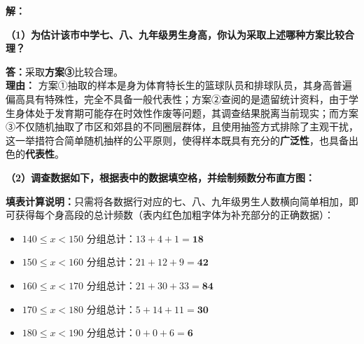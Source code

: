 \vspace{0.4cm}

\textbf{解：}

\textbf{（1）为估计该市中学七、八、九年级男生身高，你认为采取上述哪种方案比较合理？}

\vspace{0.2cm}
\textbf{答：}采取\textbf{方案③}比较合理。\\
\textbf{理由：} 方案①抽取的样本是身为体育特长生的篮球队员和排球队员，其身高普遍偏高具有特殊性，完全不具备一般代表性；方案②查阅的是遗留统计资料，由于学生身体处于发育期可能存在时效性作废等问题，其调查结果脱离当前现实；而方案③不仅随机抽取了市区和郊县的不同圈层群体，且使用抽签方式排除了主观干扰，这一举措符合简单随机抽样的公平原则，使得样本既具有充分的\textbf{广泛性}，也具备出色的\textbf{代表性}。

\vspace{0.6cm}

\textbf{（2）调查数据如下，根据表中的数据填空格，并绘制频数分布直方图：}

\vspace{0.2cm}
\textbf{填表计算说明：}只需将各数据行对应的七、八、九年级男生人数横向简单相加，即可获得每个身高段的总计频数（表内红色加粗字体为补充部分的正确数据）：
\begin{itemize}
  \item $140 \leqslant x < 150$ 分组总计：$13 + 4 + 1 = \boldsymbol{18}$
  \item $150 \leqslant x < 160$ 分组总计：$21 + 12 + 9 = \boldsymbol{42}$
  \item $160 \leqslant x < 170$ 分组总计：$21 + 30 + 33 = \boldsymbol{84}$
  \item $170 \leqslant x < 180$ 分组总计：$5 + 14 + 11 = \boldsymbol{30}$
  \item $180 \leqslant x < 190$ 分组总计：$0 + 0 + 6 = \boldsymbol{6}$
\end{itemize}

